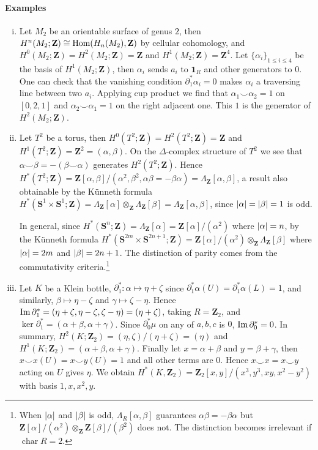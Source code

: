 \documentclass[11pt]{article}
\theoremstyle{definition}
\theoremstyle{plain}
\newcommand{\im}{\textup{Im}\,}
\newcommand{\Z}{\mathbf{Z}}
\newcommand{\Hom}{\textup{Hom}}
\DeclareMathOperator{\Char}{char}
\newcommand{\1}{\mathbf{1}}
\newcommand{\s}{\mathbf{S}}
\begin{document}
\paragraph{Examples}\begin{enumerate}[(i)]
\item Let $M_2$ be an orientable surface of genus $2$, then $H^n(M_2;\Z)\cong\Hom(H_n(M_2),\Z)$ by cellular cohomology, and $H^0(M_2;\Z)=H^2(M_2;\Z)=\Z$ and $H^1(M_2;\Z)=\Z^4$. Let $\{\alpha_i\}_{1\leq i\leq4}$ be the basis of $H^1(M_2;\Z)$, then $\alpha_i$ sends $a_i$ to $\1_R$ and other generators to $0$. One can check that the vanishing condition $\partial^\ast_1\alpha_i=0$ makes $\alpha_i$ a traversing line between two $a_i$. Applying cup product we find that $\alpha_1\smile\alpha_2=1$ on $[0,2,1]$ and $\alpha_2\smile\alpha_1=1$ on the right adjacent one. This $1$ is the generator of $H^2(M_2;\Z)$.

\item Let $T^2$ be a torus, then $H^0(T^2;\Z)=H^2(T^2;\Z)=\Z$ and $H^1(T^2;\Z)=\Z^2=(\alpha,\beta)$. On the $\Delta$-complex structure of $T^2$ we see that $\alpha\smile\beta=-(\beta\smile\alpha)$ generates $H^2(T^2;\Z)$. Hence $H^\ast(T^2;\Z)=\Z[\alpha,\beta]/(\alpha^2,\beta^2,\alpha\beta=-\beta\alpha)=\Lambda_\Z[\alpha,\beta]$, a result also obtainable by the Künneth formula $H^\ast(\s^1\times\s^1;\Z)=\Lambda_\Z[\alpha]\otimes_\Z\Lambda_\Z[\beta]=\Lambda_\Z[\alpha,\beta]$, since $\abs{\alpha}=\abs{\beta}=1$ is odd.\medbreak

In general, since $H^\ast(\s^n;\Z)=\Lambda_\Z[\alpha]=\Z[\alpha]/(\alpha^2)$ where $\abs{\alpha}=n$, by the Künneth formula $H^\ast(\s^{2m}\times\s^{2n+1};\Z)=\Z[\alpha]/(\alpha^2)\otimes_\Z\Lambda_\Z[\beta]$ where $\abs{\alpha}=2m$ and $\abs{\beta}=2n+1$. The distinction of parity comes from the commutativity criteria.\footnote{When $\abs{\alpha}$ and $\abs{\beta}$ is odd, $\Lambda_R[\alpha,\beta]$ guarantees $\alpha\beta=-\beta\alpha$ but $\Z[\alpha]/(\alpha^2)\otimes_\Z\Z[\beta]/(\beta^2)$ does not. The distinction becomes irrelevant if $\Char R=2$.}

\item Let $K$ be a Klein bottle, $\partial_1^\ast:\alpha\mapsto\eta+\zeta$ since $\partial_1^\ast\alpha(U)=\partial_1^\ast\alpha(L)=1$, and similarly, $\beta\mapsto\eta-\zeta$ and $\gamma\mapsto\zeta-\eta$. Hence $\im\partial_1^\ast=(\eta+\zeta,\eta-\zeta,\zeta-\eta)=(\eta+\zeta)$, taking $R=\Z_2$, and $\ker\partial^\ast_1=(\alpha+\beta,\alpha+\gamma)$. Since $\partial_0^\ast\mu$ on any of $a,b,c$ is $0$, $\im\partial^\ast_0=0$. In summary, $H^2(K;\Z_2)=(\eta,\zeta)/(\eta+\zeta)=(\eta)$ and $H^1(K;\Z_2)=(\alpha+\beta,\alpha+\gamma)$. Finally let $x=\alpha+\beta$ and $y=\beta+\gamma$, then $x\smile x(U)=x\smile y(U)=1$ and all other terms are $0$. Hence $x\smile x=x\smile y$ acting on $U$ gives $\eta$. We obtain $H^\ast(K,\Z_2)=\Z_2[x,y]/(x^3,y^3,xy,x^2-y^2)$ with basis $1,x,x^2,y$.


\end{enumerate}
\end{document}
